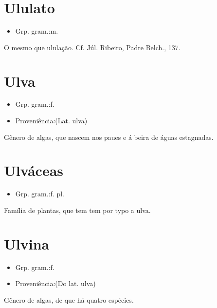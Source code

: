 \documentclass{article}
\begin{document}
\section{Ululato}
\begin{itemize}
\item {Grp. gram.:m.}
\end{itemize}
O mesmo que \textunderscore ululação\textunderscore . Cf. Júl. Ribeiro, \textunderscore Padre Belch.\textunderscore , 137.
\section{Ulva}
\begin{itemize}
\item {Grp. gram.:f.}
\end{itemize}
\begin{itemize}
\item {Proveniência:(Lat. \textunderscore ulva\textunderscore )}
\end{itemize}
Gênero de algas, que nascem nos paues e á beira de águas estagnadas.
\section{Ulváceas}
\begin{itemize}
\item {Grp. gram.:f. pl.}
\end{itemize}
Família de plantas, que tem tem por typo a ulva.
\section{Ulvina}
\begin{itemize}
\item {Grp. gram.:f.}
\end{itemize}
\begin{itemize}
\item {Proveniência:(Do lat. \textunderscore ulva\textunderscore )}
\end{itemize}
Gênero de algas, de que há quatro espécies.
\end{document}
